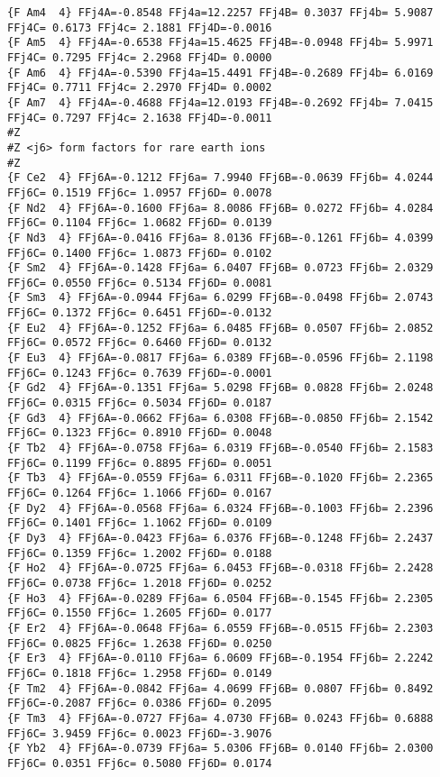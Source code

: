 {\begin{verbatim}
{F Am4  4} FFj4A=-0.8548 FFj4a=12.2257 FFj4B= 0.3037 FFj4b= 5.9087 FFj4C= 0.6173 FFj4c= 2.1881 FFj4D=-0.0016 
{F Am5  4} FFj4A=-0.6538 FFj4a=15.4625 FFj4B=-0.0948 FFj4b= 5.9971 FFj4C= 0.7295 FFj4c= 2.2968 FFj4D= 0.0000 
{F Am6  4} FFj4A=-0.5390 FFj4a=15.4491 FFj4B=-0.2689 FFj4b= 6.0169 FFj4C= 0.7711 FFj4c= 2.2970 FFj4D= 0.0002 
{F Am7  4} FFj4A=-0.4688 FFj4a=12.0193 FFj4B=-0.2692 FFj4b= 7.0415 FFj4C= 0.7297 FFj4c= 2.1638 FFj4D=-0.0011 
#Z
#Z <j6> form factors for rare earth ions
#Z
{F Ce2  4} FFj6A=-0.1212 FFj6a= 7.9940 FFj6B=-0.0639 FFj6b= 4.0244 FFj6C= 0.1519 FFj6c= 1.0957 FFj6D= 0.0078 
{F Nd2  4} FFj6A=-0.1600 FFj6a= 8.0086 FFj6B= 0.0272 FFj6b= 4.0284 FFj6C= 0.1104 FFj6c= 1.0682 FFj6D= 0.0139 
{F Nd3  4} FFj6A=-0.0416 FFj6a= 8.0136 FFj6B=-0.1261 FFj6b= 4.0399 FFj6C= 0.1400 FFj6c= 1.0873 FFj6D= 0.0102 
{F Sm2  4} FFj6A=-0.1428 FFj6a= 6.0407 FFj6B= 0.0723 FFj6b= 2.0329 FFj6C= 0.0550 FFj6c= 0.5134 FFj6D= 0.0081 
{F Sm3  4} FFj6A=-0.0944 FFj6a= 6.0299 FFj6B=-0.0498 FFj6b= 2.0743 FFj6C= 0.1372 FFj6c= 0.6451 FFj6D=-0.0132 
{F Eu2  4} FFj6A=-0.1252 FFj6a= 6.0485 FFj6B= 0.0507 FFj6b= 2.0852 FFj6C= 0.0572 FFj6c= 0.6460 FFj6D= 0.0132 
{F Eu3  4} FFj6A=-0.0817 FFj6a= 6.0389 FFj6B=-0.0596 FFj6b= 2.1198 FFj6C= 0.1243 FFj6c= 0.7639 FFj6D=-0.0001 
{F Gd2  4} FFj6A=-0.1351 FFj6a= 5.0298 FFj6B= 0.0828 FFj6b= 2.0248 FFj6C= 0.0315 FFj6c= 0.5034 FFj6D= 0.0187 
{F Gd3  4} FFj6A=-0.0662 FFj6a= 6.0308 FFj6B=-0.0850 FFj6b= 2.1542 FFj6C= 0.1323 FFj6c= 0.8910 FFj6D= 0.0048 
{F Tb2  4} FFj6A=-0.0758 FFj6a= 6.0319 FFj6B=-0.0540 FFj6b= 2.1583 FFj6C= 0.1199 FFj6c= 0.8895 FFj6D= 0.0051 
{F Tb3  4} FFj6A=-0.0559 FFj6a= 6.0311 FFj6B=-0.1020 FFj6b= 2.2365 FFj6C= 0.1264 FFj6c= 1.1066 FFj6D= 0.0167 
{F Dy2  4} FFj6A=-0.0568 FFj6a= 6.0324 FFj6B=-0.1003 FFj6b= 2.2396 FFj6C= 0.1401 FFj6c= 1.1062 FFj6D= 0.0109 
{F Dy3  4} FFj6A=-0.0423 FFj6a= 6.0376 FFj6B=-0.1248 FFj6b= 2.2437 FFj6C= 0.1359 FFj6c= 1.2002 FFj6D= 0.0188 
{F Ho2  4} FFj6A=-0.0725 FFj6a= 6.0453 FFj6B=-0.0318 FFj6b= 2.2428 FFj6C= 0.0738 FFj6c= 1.2018 FFj6D= 0.0252 
{F Ho3  4} FFj6A=-0.0289 FFj6a= 6.0504 FFj6B=-0.1545 FFj6b= 2.2305 FFj6C= 0.1550 FFj6c= 1.2605 FFj6D= 0.0177 
{F Er2  4} FFj6A=-0.0648 FFj6a= 6.0559 FFj6B=-0.0515 FFj6b= 2.2303 FFj6C= 0.0825 FFj6c= 1.2638 FFj6D= 0.0250 
{F Er3  4} FFj6A=-0.0110 FFj6a= 6.0609 FFj6B=-0.1954 FFj6b= 2.2242 FFj6C= 0.1818 FFj6c= 1.2958 FFj6D= 0.0149 
{F Tm2  4} FFj6A=-0.0842 FFj6a= 4.0699 FFj6B= 0.0807 FFj6b= 0.8492 FFj6C=-0.2087 FFj6c= 0.0386 FFj6D= 0.2095 
{F Tm3  4} FFj6A=-0.0727 FFj6a= 4.0730 FFj6B= 0.0243 FFj6b= 0.6888 FFj6C= 3.9459 FFj6c= 0.0023 FFj6D=-3.9076 
{F Yb2  4} FFj6A=-0.0739 FFj6a= 5.0306 FFj6B= 0.0140 FFj6b= 2.0300 FFj6C= 0.0351 FFj6c= 0.5080 FFj6D= 0.0174 

\end{verbatim}}
